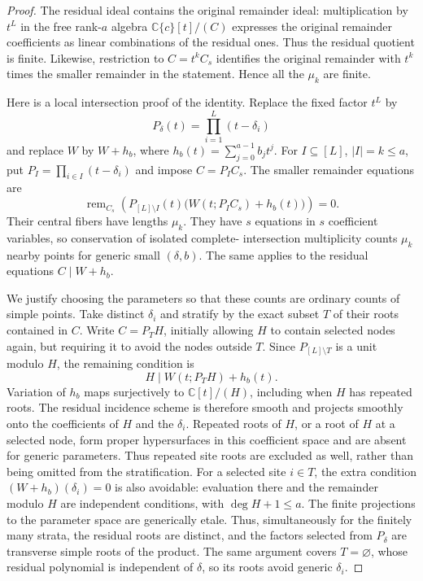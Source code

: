 \documentclass[11pt]{article}
\theoremstyle{definition}
\newcommand{\C}{\mathbb C}
\begin{document}
\begin{proof}
The residual ideal contains the original remainder ideal: multiplication
by $t^L$ in the free rank-$a$ algebra $\C\{c\}[t]/(C)$ expresses the
original remainder coefficients as linear combinations of the residual
ones. Thus the residual quotient is finite. Likewise, restriction to
$C=t^kC_s$ identifies the original remainder with $t^k$ times the
smaller remainder in the statement. Hence all the $\mu_k$ are finite.

Here is a local intersection proof of the identity. Replace the fixed
factor $t^L$ by
\[
 P_\delta(t)=\prod_{i=1}^L(t-\delta_i)
\]
and replace $W$ by $W+h_b$, where $h_b(t)=\sum_{j=0}^{a-1}b_jt^j$.
For $I\subseteq[L]$, $|I|=k\le a$, put
$P_I=\prod_{i\in I}(t-\delta_i)$ and impose $C=P_IC_s$. The smaller
remainder equations are
\[
 \operatorname{rem}_{C_s}
 \left(P_{[L]\setminus I}(t)
             \bigl(W(t;P_IC_s)+h_b(t)\bigr)\right)=0.
\]
Their central fibers have lengths $\mu_k$. They have $s$ equations in
$s$ coefficient variables, so conservation of isolated complete-
intersection multiplicity counts $\mu_k$ nearby points for generic
small $(\delta,b)$. The same applies to the residual equations
$C\mid W+h_b$.

We justify choosing the parameters so that these counts are ordinary
counts of simple points. Take distinct $\delta_i$ and stratify by the
exact subset $T$ of their roots contained in $C$. Write $C=P_TH$,
initially allowing $H$ to contain selected nodes again, but requiring
it to avoid the nodes outside $T$. Since $P_{[L]\setminus T}$ is a
unit modulo $H$, the remaining condition is
\[
 H\mid W(t;P_TH)+h_b(t).
\]
Variation of $h_b$ maps surjectively to $\C[t]/(H)$, including when
$H$ has repeated roots. The residual incidence scheme is therefore
smooth and projects smoothly onto the coefficients of $H$ and the
$\delta_i$. Repeated roots of $H$, or a root of $H$ at a selected node,
form proper hypersurfaces in this coefficient space and are absent
for generic parameters. Thus repeated site roots are excluded as
well, rather than being omitted from the stratification.
For a selected site $i\in T$, the extra condition
$(W+h_b)(\delta_i)=0$ is also avoidable: evaluation there and the
remainder modulo $H$ are independent conditions, with
$\deg H+1\le a$. The finite projections to the parameter space are
generically etale. Thus, simultaneously for the finitely many strata,
the residual roots are distinct, and the factors selected from
$P_\delta$ are transverse simple roots of the product. The same
argument covers $T=\varnothing$, whose residual polynomial is
independent of $\delta$, so its roots avoid generic $\delta_i$.


\end{proof}
\end{document}
